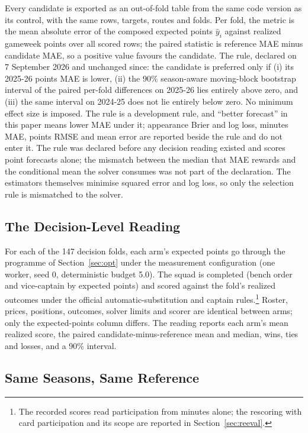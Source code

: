 \documentclass[11pt,a4paper]{article}
\begin{document}
Every candidate is exported as an out-of-fold table from the same code version as its control, with the same rows, targets, routes and folds. Per fold, the metric is the mean absolute error of the composed expected points $\hat y_i$ against realized gameweek points over all scored rows; the paired statistic is reference MAE minus candidate MAE, so a positive value favours the candidate. The rule, declared on 7 September 2026 and unchanged since: the candidate is preferred only if (i) its 2025-26 points MAE is lower, (ii) the 90\% season-aware moving-block bootstrap interval of the paired per-fold differences on 2025-26 lies entirely above zero, and (iii) the same interval on 2024-25 does not lie entirely below zero. No minimum effect size is imposed. The rule is a development rule, and ``better forecast'' in this paper means lower MAE under it; appearance Brier and log loss, minutes MAE, points RMSE and mean error are reported beside the rule and do not enter it. The rule was declared before any decision reading existed and scores point forecasts alone; the mismatch between the median that MAE rewards \cite{gneiting2011} and the conditional mean the solver consumes was not part of the declaration. The estimators themselves minimise squared error and log loss, so only the selection rule is mismatched to the solver.

\subsection{The Decision-Level Reading}

For each of the 147 decision folds, each arm's expected points go through the programme of Section~\ref{sec:opt} under the measurement configuration (one worker, seed 0, deterministic budget 5.0). The squad is completed (bench order and vice-captain by expected points) and scored against the fold's realized outcomes under the official automatic-substitution and captain rules.\footnote{The recorded scores read participation from minutes alone; the rescoring with card participation and its scope are reported in Section~\ref{sec:reeval}.} Roster, prices, positions, outcomes, solver limits and scorer are identical between arms; only the expected-points column differs. The reading reports each arm's mean realized score, the paired candidate-minus-reference mean and median, wins, ties and losses, and a 90\% interval.

\subsection{Same Seasons, Same Reference}
\label{sec:sameperiod}
\end{document}
